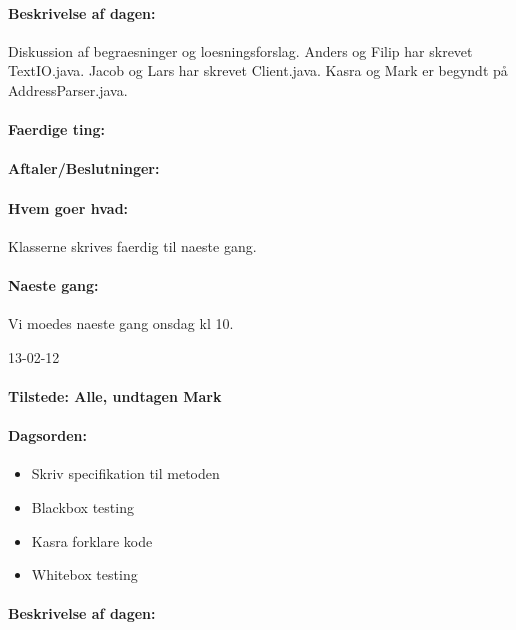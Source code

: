 \documentclass[a4paper,10pt,titlepage]{article}
\begin{document}
			\paragraph{Beskrivelse af dagen:}
			Diskussion af begraesninger og loesningsforslag. Anders og Filip har skrevet TextIO.java. Jacob og Lars har skrevet Client.java. Kasra og Mark er begyndt på AddressParser.java.
			\paragraph{Faerdige ting:}
			
			\paragraph{Aftaler/Beslutninger:}
			
			\paragraph{Hvem goer hvad:}
			Klasserne skrives faerdig til naeste gang.\
			
			\paragraph{Naeste gang:}
			Vi moedes naeste gang onsdag kl 10.\mbox{}\\
			
			\begin{center}
		13-02-12
		\end{center}
				\paragraph{Tilstede: Alle, undtagen Mark}
				\paragraph{Dagsorden:}
				\begin{itemize}
					\item Skriv specifikation til metoden
					\item Blackbox testing
					\item Kasra forklare kode
					\item Whitebox testing
				\end{itemize}
				
			\paragraph{Beskrivelse af dagen:}
			
\end{document}
